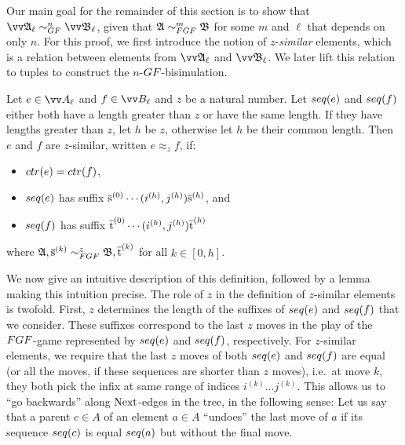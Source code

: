 Our main goal for the remainder of this section is to show that $\unravel{A}_{\ell} \bisimto_{\GF}^{n} \unravel{B}_{\ell}$, given that $\str{A} \bisimto_{\FGF}^{m} \str{B}$ for some $m$ and $\ell$ that depends on only $n$.
For this proof, we first introduce the notion of $z$-\emph{similar} elements, which is a relation between elements from $\unravel{A}_{\ell}$ and $\unravel{B}_{\ell}$.
We later lift this relation to tuples to construct the $n$-$\GF$-bisimulation.
\begin{definition}
 Let $e \in \unraveldom{A}_{\ell}$ and $f \in \unraveldom{B}_{\ell}$ and $z$ be a natural number.
 Let $\seq{e}$ and $\seq{f}$ either both have a length greater than $z$ or have the same length.
 If they have lengths greater than $z$, let $h$ be $z$, otherwise let $h$ be their common length.
 Then $e$ and $f$ are $z$-similar, written $e \approx_{z} f$, if:
 \begin{itemize}
   \item $\ctr{e} = \ctr{f}$,
   \item $\seq{e}$ has suffix $\overline{\mathrm{s}}^{(0)}\cdots(i^{(h)},j^{(h)})\overline{\mathrm{s}}^{(h)}$, and
   \item $\seq{f}$ has suffix $\overline{\mathrm{t}}^{(0)}\cdots(i^{(h)},j^{(h)})\overline{\mathrm{t}}^{(h)}$
 \end{itemize}
 where $\str{A}, \elemtuples^{(k)} \bisimto_{\FGF}^{z} \str{B}, \elemtuplet^{(k)}$ for all $k \in [0,h]$.
\end{definition}
We now give an intuitive description of this definition, followed by a lemma making this intuition precise.
The role of $z$ in the definition of $z$-similar elements is twofold.
First, $z$ determines the length of the suffixes of $\seq{e}$ and $\seq{f}$ that we consider.
These suffixes correspond to the last $z$ moves in the play of the $\FGF$-game represented by $\seq{e}$ and $\seq{f}$, respectively.
For $z$-similar elements, we require that the last $z$ moves of both $\seq{e}$ and $\seq{f}$ are equal (or all the moves, if these sequences are shorter than $z$ moves), i.e.\ at move $k$, they both pick the infix at same range of indices $i^{(k)}\ldots{}j^{(k)}$.
This allows us to ``go backwards'' along $\mathrm{Next}$-edges in the tree, in the following sense:
Let us say that a parent $c \in A$ of an element $a \in A$ ``undoes'' the last move of $a$ if its sequence $\seq{c}$ is equal $\seq{a}$ but without the final move.
